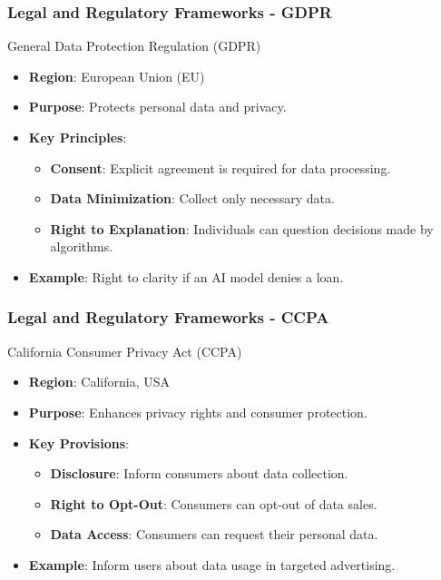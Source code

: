 \documentclass[aspectratio=169]{beamer}
\begin{document}
\begin{frame}[fragile]
    \frametitle{Legal and Regulatory Frameworks - GDPR}
    \begin{block}{General Data Protection Regulation (GDPR)}
        \begin{itemize}
            \item \textbf{Region}: European Union (EU)
            \item \textbf{Purpose}: Protects personal data and privacy.
            \item \textbf{Key Principles}:
            \begin{itemize}
                \item \textbf{Consent}: Explicit agreement is required for data processing.
                \item \textbf{Data Minimization}: Collect only necessary data.
                \item \textbf{Right to Explanation}: Individuals can question decisions made by algorithms.
            \end{itemize}
            \item \textbf{Example}: Right to clarity if an AI model denies a loan.
        \end{itemize}
    \end{block}
\end{frame}

\begin{frame}[fragile]
    \frametitle{Legal and Regulatory Frameworks - CCPA}
    \begin{block}{California Consumer Privacy Act (CCPA)}
        \begin{itemize}
            \item \textbf{Region}: California, USA
            \item \textbf{Purpose}: Enhances privacy rights and consumer protection.
            \item \textbf{Key Provisions}:
            \begin{itemize}
                \item \textbf{Disclosure}: Inform consumers about data collection.
                \item \textbf{Right to Opt-Out}: Consumers can opt-out of data sales.
                \item \textbf{Data Access}: Consumers can request their personal data.
            \end{itemize}
            \item \textbf{Example}: Inform users about data usage in targeted advertising.
        \end{itemize}
    \end{block}
\end{frame}
\end{document}
